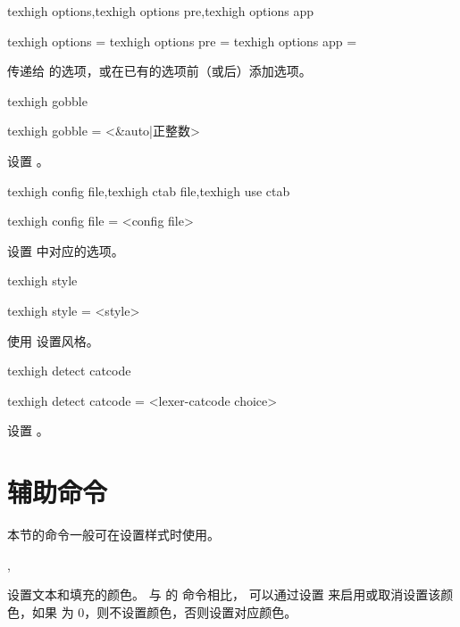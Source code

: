 \documentclass[class=article,openany]{cusdoc}[2025/09/29]
\begin{document}
\begin{keyval}[module=tcolorbox, path=/tcb]{texhigh options,texhigh options pre,texhigh options app}
  \begin{syntax}
    texhigh options     = 
    texhigh options pre = 
    texhigh options app = 
  \end{syntax}
传递给  的选项，或在已有的选项前（或后）添加选项。
\end{keyval}

\begin{keyval}[module=tcolorbox, path=/tcb]{texhigh gobble}
  \begin{syntax}
    texhigh gobble = <&auto|正整数>
  \end{syntax}
设置 。
\end{keyval}

\begin{keyval}[module=tcolorbox, path=/tcb]{
  texhigh config file,texhigh ctab file,texhigh use ctab
}
  \begin{syntax}
    texhigh config file = <{config file}>
  \end{syntax}
设置  中对应的选项。
\end{keyval}

\begin{keyval}[module=tcolorbox, path=/tcb]{texhigh style}
  \begin{syntax}
    texhigh style = <{style}>
  \end{syntax}
使用  设置风格。
\end{keyval}

\begin{keyval}[module=tcolorbox, path=/tcb]{texhigh detect catcode}
  \begin{syntax}
    texhigh detect catcode = <{lexer-catcode choice}>
  \end{syntax}
设置 。
\end{keyval}


\section{辅助命令}

本节的命令一般可在设置样式时使用。

\begin{function}{\THcolor,\THColorStatus}
  \begin{syntax}
    \V\THcolor {}
    \V\THcolor {} 
    \V\THColorStatus {}
  \end{syntax}
设置文本和填充的颜色。
与 \autocite{xcolor} 的  命令相比， 可以通过设置  来启用或取消设置该颜色，如果  为 0，则不设置颜色，否则设置对应颜色。
\end{function}
\end{document}
